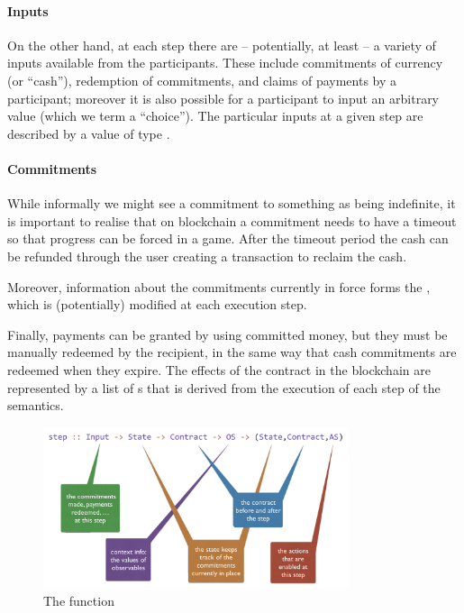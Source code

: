 \documentclass[
      acmsmall
    , screen
    , review=true
  ]{acmart}
\begin{document}
\paragraph{Inputs}


On the other hand, at each step there are -- potentially, at least -- a variety of inputs available from the participants. These include commitments of currency (or ``cash''), redemption of commitments, and claims of payments by a participant; moreover it is also possible for a participant to input an arbitrary value (which we term a ``choice''). The particular inputs at a given step are described by a value of type .

\paragraph{Commitments}


While informally we might see a commitment to something as being indefinite, it is important to realise that on blockchain a commitment needs to have a timeout so that progress can be forced in a game. After the timeout period the cash can be refunded through the user creating a transaction to reclaim the cash.

Moreover, information about the commitments currently in force forms the , which is (potentially) modified at each execution step. 

Finally, payments can be granted by using committed money, but they must be manually redeemed by the recipient, in the 
same way that cash commitments are redeemed when they expire. The effects of the contract in the blockchain are 
represented by a list  of s that is derived from the execution of each step of the semantics.

\begin{figure}[t]
\begin{center}
\includegraphics[width=0.8\textwidth]{pix/step-type.png}
\caption{The  function}
\label{fig:step-function}
\end{center}
\end{figure}
\end{document}
